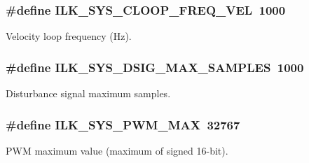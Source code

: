 \subsubsection[{\texorpdfstring{I\+L\+K\+\_\+\+S\+Y\+S\+\_\+\+C\+L\+O\+O\+P\+\_\+\+F\+R\+E\+Q\+\_\+\+V\+EL}{ILK_SYS_CLOOP_FREQ_VEL}}]{\setlength{\rightskip}{0pt plus 5cm}\#define I\+L\+K\+\_\+\+S\+Y\+S\+\_\+\+C\+L\+O\+O\+P\+\_\+\+F\+R\+E\+Q\+\_\+\+V\+EL~1000}\hypertarget{group__IL__CONST__SYS_gab7567b15639de41f00debc89e8cf69c1}{}\label{group__IL__CONST__SYS_gab7567b15639de41f00debc89e8cf69c1}


Velocity loop frequency (Hz). 

\subsubsection[{\texorpdfstring{I\+L\+K\+\_\+\+S\+Y\+S\+\_\+\+D\+S\+I\+G\+\_\+\+M\+A\+X\+\_\+\+S\+A\+M\+P\+L\+ES}{ILK_SYS_DSIG_MAX_SAMPLES}}]{\setlength{\rightskip}{0pt plus 5cm}\#define I\+L\+K\+\_\+\+S\+Y\+S\+\_\+\+D\+S\+I\+G\+\_\+\+M\+A\+X\+\_\+\+S\+A\+M\+P\+L\+ES~1000}\hypertarget{group__IL__CONST__SYS_ga67fd909fd6fa467e246a1d03aaaab058}{}\label{group__IL__CONST__SYS_ga67fd909fd6fa467e246a1d03aaaab058}


Disturbance signal maximum samples. 

\subsubsection[{\texorpdfstring{I\+L\+K\+\_\+\+S\+Y\+S\+\_\+\+P\+W\+M\+\_\+\+M\+AX}{ILK_SYS_PWM_MAX}}]{\setlength{\rightskip}{0pt plus 5cm}\#define I\+L\+K\+\_\+\+S\+Y\+S\+\_\+\+P\+W\+M\+\_\+\+M\+AX~32767}\hypertarget{group__IL__CONST__SYS_gaefbce026149e3fd1ca4912e8b831e1c0}{}\label{group__IL__CONST__SYS_gaefbce026149e3fd1ca4912e8b831e1c0}


P\+WM maximum value (maximum of signed 16-\/bit). 

